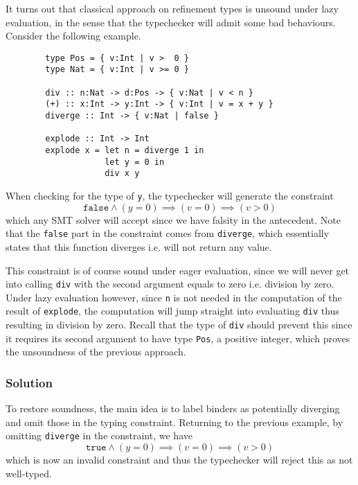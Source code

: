 \documentclass[a4paper,UKenglish]{lipics-v2016}
\begin{document}
      It turns out that classical approach on refinement types is unsound under
      lazy evaluation, in the sense that the typechecker will admit some bad
      behaviours.  Consider the following example.
      \begin{verbatim}
        type Pos = { v:Int | v >  0 }
        type Nat = { v:Int | v >= 0 }

        div :: n:Nat -> d:Pos -> { v:Nat | v < n } 
        (+) :: x:Int -> y:Int -> { v:Int | v = x + y }
        diverge :: Int -> { v:Nat | false } 

        explode :: Int -> Int
        explode x = let n = diverge 1 in 
                    let y = 0 in 
                    div x y
      \end{verbatim}

      When checking for the type of \texttt{y}, the typechecker will generate
      the constraint
      $$\mathtt{false}\wedge(y=0)\implies(v=0)\implies(v>0)$$
      which any SMT solver will accept since we have falsity in the antecedent.
      Note that the \texttt{false} part in the constraint comes from
      \texttt{diverge}, which essentially states that this function diverges
      i.e. will not return any value.

      This constraint is of course sound under eager evaluation, since we will
      never get into calling \texttt{div} with the second argument equals to
      zero i.e. division by zero.  Under lazy evaluation however, since
      \texttt{n} is not needed in the computation of the result of
      \texttt{explode}, the computation will jump straight into evaluating
      \texttt{div} thus resulting in division by zero.  Recall that the type of
      \texttt{div} should prevent this since it requires its second argument to
      have type \texttt{Pos}, a positive integer, which proves the unsoundness
      of the previous approach.

    \subsubsection{Solution}
      
      To restore soundness, the main idea is to label binders as potentially
      diverging and omit those in the typing constraint.  Returning to the
      previous example, by omitting \texttt{diverge} in the constraint, we have
      $$\mathtt{true}\wedge(y=0)\implies(v=0)\implies(v>0)$$
      which is now an invalid constraint and thus the typechecker will reject
      this as not well-typed.
\end{document}
